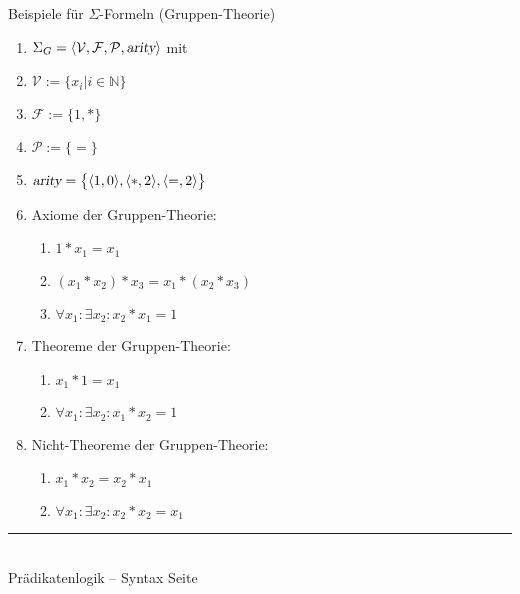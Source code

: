 \documentclass{slides}
\newcommand{\myrule}{\rule{20cm}{1mm}\\ }
\def\pair(#1,#2){\langle #1, #2 \rangle}
\newcounter{mypage}
\begin{document}

\begin{slide}{}
\normalsize
\begin{center}
Beispiele f\"{u}r $\Sigma$-Formeln (Gruppen-Theorie)
\end{center}
\vspace{0.5cm}

\footnotesize
\begin{enumerate}
\item $\Sigma_G = \langle \mathcal{V}, \mathcal{F}, \mathcal{P},\textsl{arity}\rangle$ mit
\item $\mathcal{V} := \{x_i | i \in \mathbb{N} \}$
\item $\mathcal{F} := \{ 1, \mathtt{*} \}$
\item $\mathcal{P} := \{ \mathtt{=} \}$
\item $\textsl{arity} = \bigl\{ \pair(1,0), \pair(\mathtt{*},2), \pair(\mathtt{=},2)\bigr\}$
\item Axiome der Gruppen-Theorie:
  \begin{enumerate}
  \item $1 * x_1 = x_1$
  \item $(x_1 * x_2) * x_3 = x_1 * (x_2 * x_3)$
  \item $\forall x_1: \exists x_2: x_2 * x_1 = 1$
  \end{enumerate}
\item Theoreme der Gruppen-Theorie:
  \begin{enumerate}
  \item $x_1 * 1= x_1$
  \item $\forall x_1: \exists x_2: x_1 * x_2 = 1$
  \end{enumerate}
\item Nicht-Theoreme der Gruppen-Theorie:
  \begin{enumerate}
  \item $x_1 * x_2 = x_2 * x_1$
  \item $\forall x_1: \exists x_2: x_2 * x_2 = x_1$
  \end{enumerate}
\end{enumerate}

\vspace*{\fill}
\tiny \addtocounter{mypage}{1}
\myrule
Pr\"{a}dikatenlogik -- Syntax  \hspace*{\fill} Seite 
\end{slide}

\end{document}
